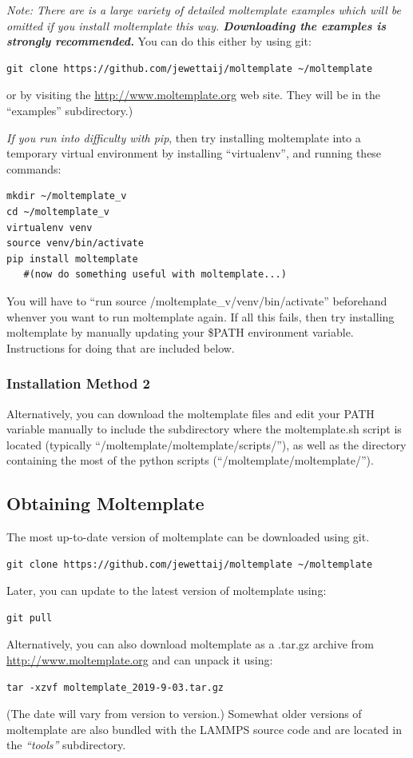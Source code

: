 \documentclass[11pt]{article}
\newcommand{\textapprox}{\raisebox{0.5ex}{\texttildelow}}
\begin{document}
\textit{Note: There are is a large variety of detailed moltemplate examples
which will be omitted if you install moltemplate this way.
\textbf{Downloading the examples is strongly recommended.}}
You can do this either by using git:
\begin{verbatim}
git clone https://github.com/jewettaij/moltemplate ~/moltemplate
\end{verbatim}
or by visiting the \url{http://www.moltemplate.org} web site.
They will be in the ``examples'' subdirectory.)

\textit{If you run into difficulty with pip}, then try installing
moltemplate into a temporary virtual environment
by installing ``virtualenv'',
and running these commands:
\begin{verbatim}
mkdir ~/moltemplate_v
cd ~/moltemplate_v
virtualenv venv
source venv/bin/activate
pip install moltemplate
   #(now do something useful with moltemplate...)
\end{verbatim}
You will have to ``run source \textapprox/moltemplate\_v/venv/bin/activate'' beforehand whenver you want to run moltemplate again.  If all this fails, then try installing moltemplate by manually updating your \$PATH environment variable.  Instructions for doing that are included below.


\subsubsection*{Installation Method 2}

Alternatively, you can download the moltemplate files and edit your
PATH variable manually to include
the subdirectory where the moltemplate.sh script is located 
(typically ``\textapprox/moltemplate/moltemplate/scripts/''), as well as
the directory containing the most of the python scripts
(``\textapprox/moltemplate/moltemplate/'').

\subsection*{Obtaining Moltemplate}
The most up-to-date version of moltemplate can be downloaded using git.
\begin{verbatim}
git clone https://github.com/jewettaij/moltemplate ~/moltemplate
\end{verbatim}
Later, you can update to the latest version of moltemplate using:
\begin{verbatim}
git pull
\end{verbatim}
Alternatively, you can also download moltemplate as a .tar.gz archive from
\url{http://www.moltemplate.org}
and can unpack it using:
\begin{verbatim}
tar -xzvf moltemplate_2019-9-03.tar.gz
\end{verbatim}
(The date will vary from version to version.)
Somewhat older versions of moltemplate are also bundled with the LAMMPS 
source code and are located in the \textit{``tools''} subdirectory.
\end{document}

